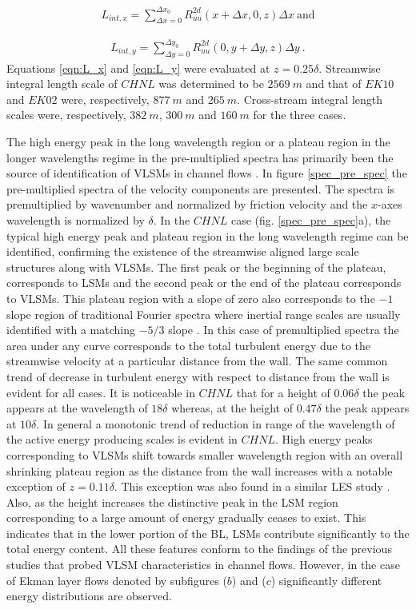 \documentclass{amsart}
\begin{document}
\begin{align}
L_{int,x}=\sum_{\Delta x=0}^{\Delta x_{0}}R_{uu}^{2d}(x+\Delta x, 0,z)\Delta x \ \text{and}
\label{eqn:L_x}
\end{align}

\begin{align}
L_{int,y}=\sum_{\Delta y=0}^{\Delta y_{0}}R_{uu}^{2d}(0, y+\Delta y,z)\Delta y\ .
\label{eqn:L_y}
\end{align}
Equations \ref{eqn:L_x} and \ref{eqn:L_y} were evaluated at $z=0.25\delta$. Streamwise integral length scale of $CHNL$ was determined  to be $2569\ m$ and that of $EK10$ and $EK02$ were, respectively, $877\ m$ and $265\ m$. Cross-stream integral length scales were, respectively, $382\ m$, $300\ m$ and $160\ m$ for the three cases. 

The high energy peak in the  long wavelength region or a plateau region in the longer wavelengths regime in the pre-multiplied spectra has primarily been the source of identification of VLSMs in channel flows \citep{guala_adrian_jfm2006, fang2015blm}. In figure \ref{spec_pre_spec} the pre-multiplied spectra of the velocity components are presented. The spectra is  premultiplied by wavenumber and normalized by friction velocity and the $x$-axes wavelength is normalized by $\delta$.  In the $CHNL$ case (fig. \ref{spec_pre_spec}a), the typical high energy peak and plateau region in the long wavelength regime can be identified, confirming the existence of the streamwise aligned large scale structures along with VLSMs. The first peak or the beginning of the plateau, corresponds to LSMs and the second peak or the end of the plateau corresponds to VLSMs. This plateau region with a slope of zero also corresponds to the $-1$ slope region of traditional Fourier spectra where inertial range scales are usually identified with a matching $-5/3$ slope \citep{perry_chng_jfm_86,saddoughi1994}. In this case of premultiplied spectra the area under any curve corresponds to the total turbulent energy due to the streamwise velocity at a particular distance from the wall. The same common trend of decrease in turbulent energy with respect to distance from the wall is evident for all cases. It is noticeable in $CHNL$  that for a height of $0.06\delta$ the peak appears at the wavelength of $18\delta$ whereas, at the height of $0.47\delta$ the peak appears at $10\delta$. In general a monotonic trend of reduction in range of the wavelength of the active energy producing scales is evident in $CHNL$. High energy peaks corresponding to VLSMs shift towards smaller wavelength region with an overall shrinking plateau region as the distance from the wall increases with a notable exception of $z=0.11\delta$. This exception was also found in a similar LES study \citep{fang2015blm}.  Also, as the height increases the distinctive peak in the LSM region corresponding to a large amount of energy gradually ceases to exist. This indicates that in the lower portion of the BL, LSMs contribute significantly to the total energy content.   All these features conform to the findings of the previous studies that probed  VLSM characteristics in channel flows. However, in the case of Ekman layer flows denoted by subfigures ($b$) and ($c$)  significantly  different energy distributions are observed. 
\end{document}
